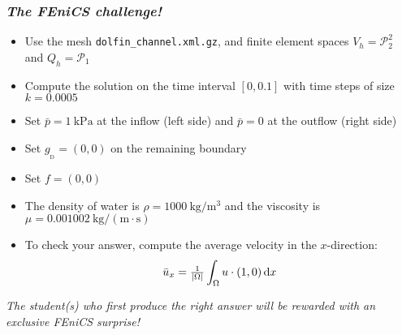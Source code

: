 \begin{frame}[fragile]
  \frametitle{\emph{The FEniCS challenge!}}

  \begin{itemize}
  \item
    Use the mesh \texttt{dolfin\_channel.xml.gz}, and finite element
    spaces $V_h = \mathcal{P}_2^2$ and $Q_h = \mathcal{P}_1$
  \item
    Compute the solution on the time interval $[0, 0.1]$ with time
    steps of size $k = 0.0005$
  \item
    Set $\bar{p} = 1~\mathrm{kPa}$ at the inflow (left side) and
    $\bar{p} = 0$ at the outflow (right side)
  \item
    Set $g_{_\mathrm{D}} = (0, 0)$ on the remaining boundary
  \item
    Set $f = (0, 0)$
  \item
    The density of water is $\rho = 1000~\mathrm{kg} / \mathrm{m}^3$ and
    the viscosity is $\mu = 0.001002~\mathrm{kg} / (\mathrm{m \cdot s})$
  \item
    To check your answer, compute the average velocity in the $x$-direction:
    \begin{equation*}
      \bar u_x = \tfrac{1}{|\Omega|} \int_{\Omega} u \cdot (1, 0) \, \mathrm{d}x
    \end{equation*}
  \end{itemize}

  \bigskip

  \emph{The student(s) who first produce the right answer will be
    rewarded with an exclusive FEniCS surprise!}

\end{frame}
